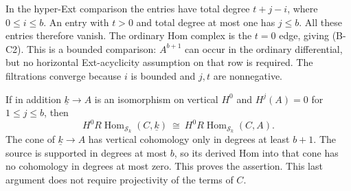 In the hyper-Ext comparison the entries have total
degree $t+j-i$, where $0\leq i\leq b$.
An entry with $t>0$ and total degree at most one
has $j\leq b$. All these entries therefore vanish.
The ordinary Hom complex is the $t=0$ edge, giving
(B-C2). This is a bounded comparison: $A^{b+1}$
can occur in the ordinary differential, but no
horizontal Ext-acyclicity assumption on that row
is required. The filtrations converge because
$i$ is bounded and $j,t$ are nonnegative.

If in addition $\underline{k}\to A$ is an
isomorphism on vertical $H^0$ and $H^j(A)=0$
for $1\leq j\leq b$, then
\begin{equation}
 H^0R\operatorname{Hom}_{\mathcal S_k}(C,\underline{k})
 \ \cong\
 H^0R\operatorname{Hom}_{\mathcal S_k}(C,A).
 \tag{B-C3}
\end{equation}
The cone of $\underline{k}\to A$ has vertical
cohomology only in degrees at least $b+1$.
The source is supported in degrees at most $b$,
so its derived Hom into that cone has no
cohomology in degrees at most zero. This
proves the assertion. This last argument
does not require projectivity of the terms
of $C$.


